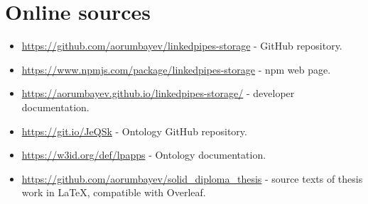 \chapter{Online sources}
\label{att:online-sources}

\begin{itemize}
  \item \url{https://github.com/aorumbayev/linkedpipes-storage} - \lpas{} GitHub repository.
  \item \url{https://www.npmjs.com/package/linkedpipes-storage} - \lpas{} npm web page.
  \item \url{https://aorumbayev.github.io/linkedpipes-storage/} - \lpas{} deve\-lo\-per documentation.
  \item \url{https://git.io/JeQSk} - \lpas{} Ontology GitHub repository.
  \item \url{https://w3id.org/def/lpapps} - \lpas{} Ontology documentation.
  \item \url{https://github.com/aorumbayev/solid_diploma_thesis} - source texts of thesis work in LaTeX, compatible with Overleaf.
  \end{itemize}